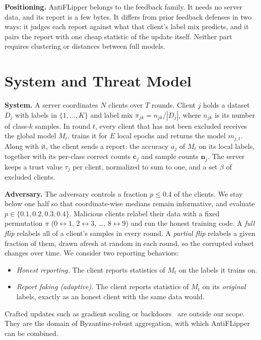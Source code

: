 \documentclass[conference]{IEEEtran}
\begin{document}
\textbf{Positioning.} AntiFLipper belongs to the feedback family. It needs no server data, and its report is a few bytes. It differs from prior feedback defenses in two ways: it judges each report against what that client's label mix predicts, and it pairs the report with one cheap statistic of the update itself. Neither part requires clustering or distances between full models.

\section{System and Threat Model}
\label{sec:model}
\textbf{System.} A server coordinates $N$ clients over $T$ rounds. Client $j$ holds a dataset $D_j$ with labels in $\{1,\dots,K\}$ and label mix $\pi_{jk}=n_{jk}/|D_j|$, where $n_{jk}$ is its number of class-$k$ samples. In round $t$, every client that has not been excluded receives the global model $M_t$, trains it for $E$ local epochs and returns the model $m_{j,t}$. Along with it, the client sends a report: the accuracy $a_j$ of $M_t$ on its local labels, together with its per-class correct counts $\mathbf{c}_j$ and sample counts $\mathbf{n}_j$. The server keeps a trust value $\tau_j$ per client, normalized to sum to one, and a set $\beta$ of excluded clients.

\textbf{Adversary.} The adversary controls a fraction $p\le 0.4$ of the clients. We stay below one half so that coordinate-wise medians remain informative, and evaluate $p\in\{0.1,0.2,0.3,0.4\}$. Malicious clients relabel their data with a fixed permutation $\pi$ ($0{\leftrightarrow}1$, $2{\leftrightarrow}3$, \dots, $8{\leftrightarrow}9$) and run the honest training code. A \emph{full flip} relabels all of a client's samples in every round. A \emph{partial flip} relabels a given fraction of them, drawn afresh at random in each round, so the corrupted subset changes over time. We consider two reporting behaviors:
\begin{itemize}
\item \emph{Honest reporting.} The client reports statistics of $M_t$ on the labels it trains on.
\item \emph{Report faking (adaptive).} The client reports statistics of $M_t$ on its \emph{original} labels, exactly as an honest client with the same data would.
\end{itemize}
Crafted updates such as gradient scaling or backdoors~\cite{bagdasaryan2020backdoor,fang2020local} are outside our scope. They are the domain of Byzantine-robust aggregation, with which AntiFLipper can be combined.
\end{document}

